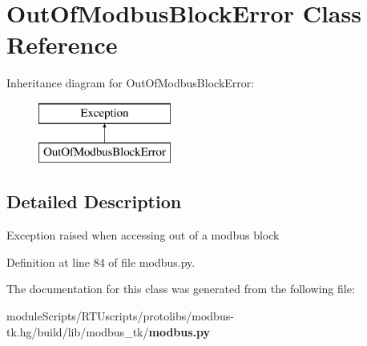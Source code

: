 \section{Out\+Of\+Modbus\+Block\+Error Class Reference}
\label{classmodbus__tk_1_1modbus_1_1_out_of_modbus_block_error}
Inheritance diagram for Out\+Of\+Modbus\+Block\+Error\+:\begin{figure}[H]
\begin{center}
\leavevmode
\includegraphics[height=2.000000cm]{classmodbus__tk_1_1modbus_1_1_out_of_modbus_block_error}
\end{center}
\end{figure}


\subsection{Detailed Description}
\begin{DoxyVerb}Exception raised when accessing out of a modbus block\end{DoxyVerb}
 

Definition at line 84 of file modbus.\+py.



The documentation for this class was generated from the following file\+:\begin{DoxyCompactItemize}
\item 
module\+Scripts/\+R\+T\+Uscripts/protolibs/modbus-\/tk.\+hg/build/lib/modbus\+\_\+tk/{\bf modbus.\+py}\end{DoxyCompactItemize}
